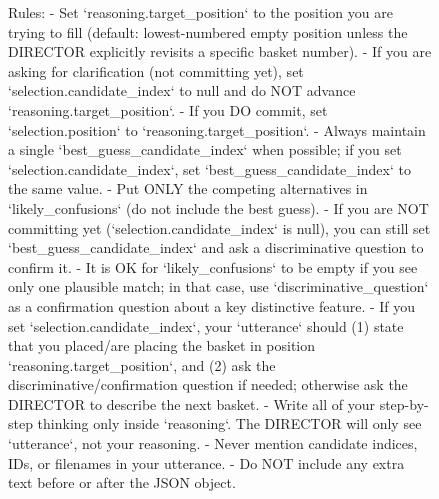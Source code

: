 \begin{figure}[t]
\begin{promptbox}
Rules:
- Set `reasoning.target_position` to the position you are trying to fill (default: lowest-numbered empty position unless the DIRECTOR explicitly revisits a specific basket number).
- If you are asking for clarification (not committing yet), set `selection.candidate_index` to null and do NOT advance `reasoning.target_position`.
- If you DO commit, set `selection.position` to `reasoning.target_position`.
- Always maintain a single `best_guess_candidate_index` when possible; if you set `selection.candidate_index`, set `best_guess_candidate_index` to the same value.
- Put ONLY the competing alternatives in `likely_confusions` (do not include the best guess).
- If you are NOT committing yet (`selection.candidate_index` is null), you can still set `best_guess_candidate_index` and ask a discriminative question to confirm it.
- It is OK for `likely_confusions` to be empty if you see only one plausible match; in that case, use `discriminative_question` as a confirmation question about a key distinctive feature.
- If you set `selection.candidate_index`, your `utterance` should (1) state that you placed/are placing the basket in position `reasoning.target_position`, and (2) ask the discriminative/confirmation question if needed; otherwise ask the DIRECTOR to describe the next basket.
- Write all of your step-by-step thinking only inside `reasoning`. The DIRECTOR will only see `utterance`, not your reasoning.
- Never mention candidate indices, IDs, or filenames in your utterance.
- Do NOT include any extra text before or after the JSON object.
\end{promptbox}
\end{figure}

